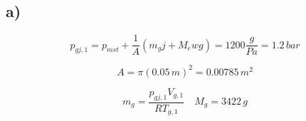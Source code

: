

\subsection*{a)}

\[
p_{gj,1} = p_{mst} + \frac{1}{A} (m_g j + M_e w g) = 1200 \frac{g}{Pa} = 1.2 \, bar
\]

\[
A = \pi (0.05 \, m)^2 = 0.00785 \, m^2
\]

\[
m_g = \frac{p_{gj,1} V_{g,1}}{R T_{g,1}} \quad M_g = 3422 \, g
\]